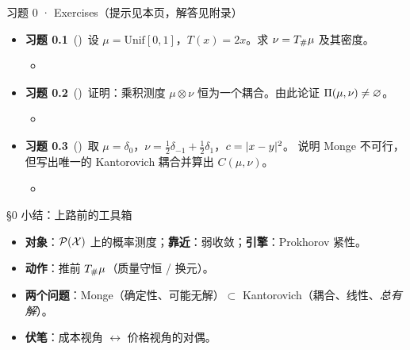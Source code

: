 \begin{frame}{习题 0 · Exercises（提示见本页，解答见附录）}
  \begin{itemize}
    \item \textbf{习题 0.1}~(\diffI)\ 设 $\mu=\mathrm{Unif}[0,1]$，$T(x)=2x$。求 $\nu={T}_{\#}\mu$ 及其密度。
      \begin{itemize}\footnotesize
        \item {}
      \end{itemize}
    \item \textbf{习题 0.2}~(\diffII)\ 证明：乘积测度 $\mu\otimes\nu$ 恒为一个耦合。由此论证 $\Pi(\mu,\nu)\neq\varnothing$。
      \begin{itemize}\footnotesize
        \item {}
      \end{itemize}
    \item \textbf{习题 0.3}~(\diffIII)\ 取 $\mu=\delta_0$，$\nu=\tfrac12\delta_{-1}{+}\tfrac12\delta_{1}$，$c=\lvert x-y\rvert^2$。
      说明 Monge 不可行，但写出唯一的 Kantorovich 耦合并算出 $C(\mu,\nu)$。
      \begin{itemize}\footnotesize
        \item {}
      \end{itemize}
  \end{itemize}
\end{frame}

\begin{frame}{§0 小结：上路前的工具箱}
  \begin{itemize}
    \item \textbf{对象}：$\mathcal{P}(\mathcal{X})$ 上的概率测度；\textbf{靠近}：弱收敛；\textbf{引擎}：Prokhorov 紧性。
    \item \textbf{动作}：推前 ${T}_{\#}\mu$（质量守恒 / 换元）。
    \item \textbf{两个问题}：Monge（确定性、可能无解）$\subset$ Kantorovich（耦合、线性、\emph{总有解}）。
    \item \textbf{伏笔}：成本视角 $\leftrightarrow$ 价格视角的对偶。
  \end{itemize}
\end{frame}
